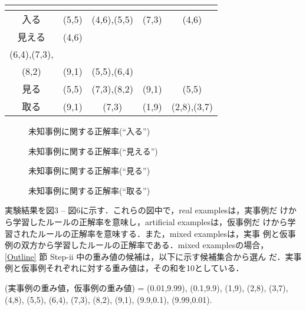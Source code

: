 \begin{table}
\begin{center}
\begin{tabular}[b]{|c|c|c|c|c|}
\begin{minipage}[c]{6em}
\begin{center}
                \end{center}
          \end{minipage}\\ 
\hline
入る    & (5,5) & (4,6),(5,5) & (7,3) & (4,6)\\
\hline
見える  & (4,6) & \begin{minipage}[c]{5em}
                        \vspace{0.5em}
                        (4,6),(5,5),\\
                        (6,4),(7,3),\\ 
                        (8,2) 
                        \vspace{0.5em}
                  \end{minipage}
        & (9,1) & (5,5),(6,4)\\
\hline
見る    & (5,5) & (7,3),(8,2) & (9,1) & (5,5) \\
\hline
取る    & (9,1) & (7,3) & (1,9) & (2,8),(3,7)\\
\hline
\end{tabular}

\end{center}
\end{table}

\begin{figure}
\begin{center}
\caption{未知事例に関する正解率(``入る'')}
\label{test1}
\caption{未知事例に関する正解率(``見える'')}
\label{test2}
\end{center}
\end{figure}

\begin{figure}
\begin{center}
\caption{未知事例に関する正解率(``見る'')}
\label{test3}
\caption{未知事例に関する正解率(``取る'')}
\label{test4}
\end{center}
\end{figure}

実験結果を図3 -- 図6に示す．これらの図中で，real examplesは，実事例だ
けから学習したルールの正解率を意味し，artificial examplesは，仮事例だ
けから学習されたルールの正解率を意味する．また，mixed examplesは，実事
例と仮事例の双方から学習したルールの正解率である．mixed examplesの場合，
\ref{Outline} 節 Step-ii 中の重み値の候補は，以下に示す候補集合から選ん
だ．実事例と仮事例それぞれに対する重み値は，その和を10としている．

(実事例の重み値，仮事例の重み値) =
(0.01,9.99), (0.1,9.9), (1,9), (2,8), (3,7), (4,8),
(5,5), (6,4), (7,3), (8,2), (9,1), (9.9,0.1), (9.99,0.01).

